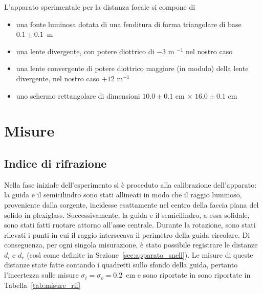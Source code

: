 \documentclass[a4paper,12pt]{article}
\begin{document}
L'apparato sperimentale per la distanza focale si compone di 

\begin{itemize}
    \item una fonte luminosa dotata di una fenditura di forma triangolare di base \\
    $0.1 \pm 0.1$~m
    \item una lente divergente, con potere diottrico di $-3$ m $^{-1}$ nel nostro caso
    \item una lente convergente di potere diottrico maggiore (in modulo) della lente divergente, nel nostro caso $+12$ m$^{-1}$ 
    \item uno schermo rettangolare di dimensioni $10.0 \pm 0.1$ cm $\times$ $16.0 \pm 0.1$ cm
\end{itemize} 

\section{Misure}

\subsection{Indice di rifrazione}

Nella fase iniziale dell'esperimento si è proceduto alla calibrazione dell'apparato: la guida e il semicilindro sono stati allineati in modo che il raggio luminoso, proveniente dalla sorgente, incidesse esattamente nel centro della faccia piana del solido in plexiglass. 
Successivamente, la guida e il semicilindro, a essa solidale, sono stati fatti ruotare attorno all'asse centrale. Durante la rotazione, sono stati rilevati i punti in cui il raggio intersecava il perimetro della guida circolare. Di conseguenza, per ogni singola misurazione, è stato possibile registrare le distanze $d_i$ e $d_r$ (così come definite in Sezione~\ref{sec:apparato_snell}).
Le misure di queste distanze state fatte contando i quadretti sullo sfondo della guida, pertanto l'incertezza sulle misure $\sigma_i = \sigma_o =0.2$~cm e sono riportate in sono riportate in Tabella~\ref{tab:misure_rif}
\end{document}
